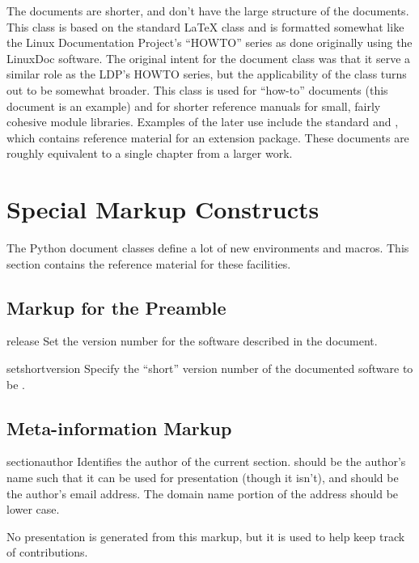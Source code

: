 \documentclass{howto}
\begin{document}
  The  documents are shorter, and don't have the large
  structure of the  documents.  This class is based on
  the standard \LaTeX{}  class and is formatted somewhat
  like the Linux Documentation Project's ``HOWTO'' series as done
  originally using the LinuxDoc software.  The original intent for the
  document class was that it serve a similar role as the LDP's HOWTO
  series, but the applicability of the class turns out to be somewhat
  broader.  This class is used for ``how-to'' documents (this
  document is an example) and for shorter reference manuals for small,
  fairly cohesive module libraries.  Examples of the later use include
  the standard 
  and
, which contains reference material for an
  extension package.  These documents are roughly equivalent to a
  single chapter from a larger work.


\section{Special Markup Constructs}

  The Python document classes define a lot of new environments and
  macros.  This section contains the reference material for these
  facilities.

  \subsection{Markup for the Preamble \label{preamble-info}}

    \begin{macrodesc}{release}{}
      Set the version number for the software described in the
      document.
    \end{macrodesc}

    \begin{macrodesc}{setshortversion}{}
      Specify the ``short'' version number of the documented software
      to be .
    \end{macrodesc}

  \subsection{Meta-information Markup \label{meta-info}}

    \begin{macrodesc}{sectionauthor}{}
      Identifies the author of the current section.  
      should be the author's name such that it can be used for
      presentation (though it isn't), and  should be the
      author's email address.  The domain name portion of
      the address should be lower case.

      No presentation is generated from this markup, but it is used to 
      help keep track of contributions.
    \end{macrodesc}
\end{document}
